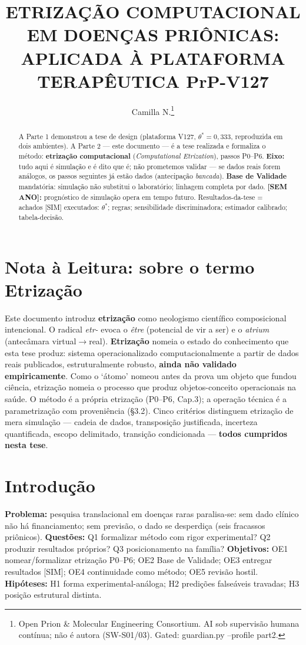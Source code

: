 \documentclass[10pt,twocolumn]{article}
\title{\bfseries ETRIZAÇÃO COMPUTACIONAL EM DOENÇAS PRIÔNICAS: APLICADA À PLATAFORMA TERAPÊUTICA PrP-V127}
\author{\normalsize Camilla N.\thanks{Open Prion \& Molecular Engineering Consortium. AI sob supervisão humana contínua; não é autora (SW-S01/03). Gated: guardian.py --profile part2.}}
\date{}
\begin{document}
\maketitle

\begin{abstract}\small
A Parte 1 demonstrou a tese de design (plataforma V127, $\theta^{*}{=}0{,}333$, reproduzida em dois ambientes). A Parte 2 --- este documento --- é a tese realizada e formaliza o método: \textbf{etrização computacional} (\emph{Computational Etrization}), passos P0--P6. \textbf{Eixo:} tudo aqui é simulação e é dito que é; não prometemos validar --- se dados reais forem análogos, os passos seguintes já estão dados (antecipação \emph{bancada}). \textbf{Base de Validade} mandatória: simulação não substitui o laboratório; linhagem completa por dado. \textbf{[SEM ANO]:} prognóstico de simulação opera em tempo futuro. Resultados-da-tese = achados [SIM] executados: $\theta^{*}$; regras; sensibilidade discriminadora; estimador calibrado; tabela-decisão.
\end{abstract}

\section*{Nota à Leitura: sobre o termo Etrização}
Este documento introduz \textbf{etrização} como neologismo científico composicional intencional. O radical \emph{etr-} evoca o \emph{être} (potencial de vir a ser) e o \emph{atrium} (antecâmara virtual$\to$real). \textbf{Etrização} nomeia o estado do conhecimento que esta tese produz: sistema operacionalizado computacionalmente a partir de dados reais publicados, estruturalmente robusto, \textbf{ainda não validado empiricamente}. Como o `átomo' nomeou antes da prova um objeto que fundou ciência, etrização nomeia o processo que produz objetos-conceito operacionais na saúde. O método é a própria etrização (P0--P6, Cap.3); a operação técnica é a parametrização com proveniência (\S3.2). Cinco critérios distinguem etrização de mera simulação --- cadeia de dados, transposição justificada, incerteza quantificada, escopo delimitado, transição condicionada --- \textbf{todos cumpridos nesta tese}.

\section{Introdução}
\textbf{Problema:} pesquisa translacional em doenças raras paralisa-se: sem dado clínico não há financiamento; sem previsão, o dado se desperdiça (seis fracassos priônicos). \textbf{Questões:} Q1 formalizar método com rigor experimental? Q2 produzir resultados próprios? Q3 posicionamento na família? \textbf{Objetivos:} OE1 nomear/formalizar etrização P0--P6; OE2 Base de Validade; OE3 entregar resultados [SIM]; OE4 continuidade como método; OE5 revisão hostil. \textbf{Hipóteses:} H1 forma experimental-análoga; H2 predições falseáveis travadas; H3 posição estrutural distinta.
\end{document}
